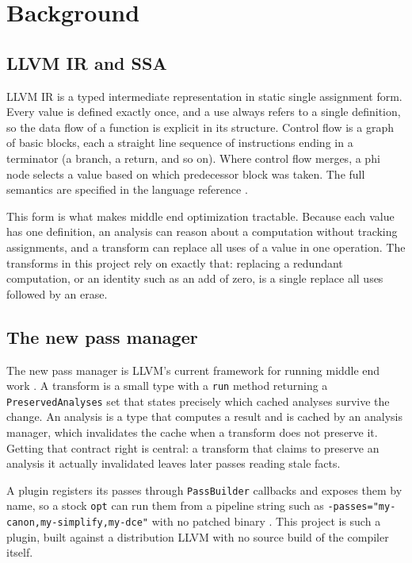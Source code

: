 \section{Background}

\subsection{LLVM IR and SSA}

LLVM IR is a typed intermediate representation in static single assignment form.
Every value is defined exactly once, and a use always refers to a single
definition, so the data flow of a function is explicit in its structure. Control
flow is a graph of basic blocks, each a straight line sequence of instructions
ending in a terminator (a branch, a return, and so on). Where control flow
merges, a phi node selects a value based on which predecessor block was taken.
The full semantics are specified in the language reference \cite{llvm_langref}.

This form is what makes middle end optimization tractable. Because each value has
one definition, an analysis can reason about a computation without tracking
assignments, and a transform can replace all uses of a value in one operation.
The transforms in this project rely on exactly that: replacing a redundant
computation, or an identity such as an add of zero, is a single replace all uses
followed by an erase.

\subsection{The new pass manager}

The new pass manager is LLVM's current framework for running middle end work
\cite{llvm_writing_pass}. A transform is a small type with a \texttt{run} method
returning a \texttt{PreservedAnalyses} set that states precisely which cached
analyses survive the change. An analysis is a type that computes a result and is
cached by an analysis manager, which invalidates the cache when a transform does
not preserve it. Getting that contract right is central: a transform that claims
to preserve an analysis it actually invalidated leaves later passes reading stale
facts.

A plugin registers its passes through \texttt{PassBuilder} callbacks and exposes
them by name, so a stock \texttt{opt} can run them from a pipeline string such as
\texttt{-passes="my-canon,my-simplify,my-dce"} with no patched binary
\cite{llvm_project}. This project is such a plugin, built against a distribution
LLVM with no source build of the compiler itself.
